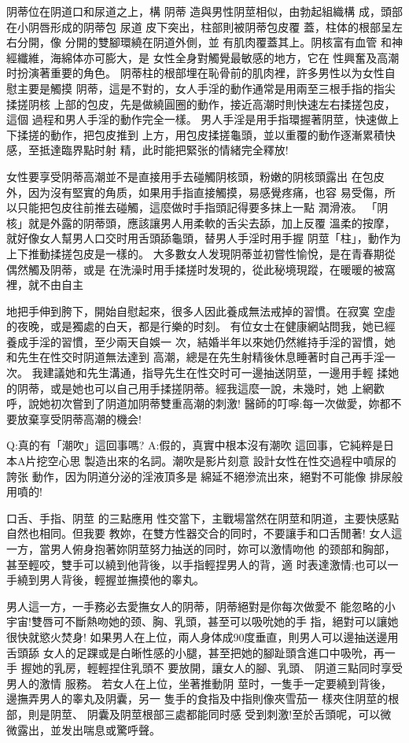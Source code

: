 \documentclass[12pt,UTF8]{ctexbook}
\begin{document}
阴蒂位在阴道口和尿道之上，構
阴蒂
造與男性阴莖相似，由勃起組織構
成，頭部在小阴唇形成的阴蒂包
尿道
皮下突出，柱部則被阴蒂包皮覆
蓋，柱体的根部呈左右分開，像
分開的雙腳環繞在阴道外側，並
有肌肉覆蓋其上。阴核富有血管
和神經纖維，海綿体亦可膨大，是
女性全身對觸覺最敏感的地方，它在
性興奮及高潮时扮演著重要的角色。
阴蒂柱的根部埋在恥骨前的肌肉裡，許多男性以为女性自慰主要是觸摸
阴蒂，這是不對的，女人手淫的動作通常是用兩至三根手指的指尖揉搓阴核
上部的包皮，先是做繞圓圈的動作，接近高潮时則快速左右揉搓包皮，這個
過程和男人手淫的動作完全一樣。
男人手淫是用手指環握著阴莖，快速做上下揉搓的動作，把包皮推到
上方，用包皮揉搓龜頭，並以重覆的動作逐漸累積快感，至抵達臨界點时射
精，此时能把緊张的情緒完全釋放!

女性要享受阴蒂高潮並不是直接用手去碰觸阴核頭，粉嫩的阴核頭露出
在包皮外，因为沒有堅實的角质，如果用手指直接觸摸，易感覺疼痛，也容
易受傷，所以只能把包皮往前推去碰觸，這麼做时手指頭記得要多抹上一點
潤滑液。
「阴核」就是外露的阴蒂頭，應該讓男人用柔軟的舌尖去舔，加上反覆
溫柔的按摩，就好像女人幫男人口交时用舌頭舔龜頭，替男人手淫时用手握
阴莖「柱」，動作为上下推動揉搓包皮是一樣的。
大多數女人发現阴蒂並初嘗性愉悅，是在青春期從偶然觸及阴蒂，或是
在洗澡时用手揉搓时发現的，從此秘境現蹤，在暖暖的被窩裡，就不由自主

地把手伸到胯下，開始自慰起來，很多人因此養成無法戒掉的習慣。在寂寞
空虛的夜晚，或是獨處的白天，都是行樂的时刻。
有位女士在健康網站問我，她已經養成手淫的習慣，至少兩天自娛一
次，結婚半年以來她仍然維持手淫的習慣，她和先生在性交时阴道無法達到
高潮，總是在先生射精後休息睡著时自己再手淫一次。
我建議她和先生溝通，指导先生在性交时可一邊抽送阴莖，一邊用手輕
揉她的阴蒂，或是她也可以自己用手揉搓阴蒂。經我這麼一說，未幾时，她
上網歡呼，說她初次嘗到了阴道加阴蒂雙重高潮的刺激!
醫師的叮嚀:每一次做愛，妳都不要放棄享受阴蒂高潮的機会!

Q:真的有「潮吹」這回事嗎?
A:假的，真實中根本沒有潮吹
這回事，它純粹是日本A片挖空心思
製造出來的名詞。潮吹是影片刻意
設計女性在性交過程中噴尿的誇张
動作，因为阴道分泌的淫液頂多是
綿延不絕滲流出來，絕對不可能像
排尿般用噴的!

口舌、手指、阴莖
的三點應用
性交當下，主戰場當然在阴莖和阴道，主要快感點自然也相同。但我要
教妳，在雙方性器交合的同时，不要讓手和口舌閒著!
女人這一方，當男人俯身抱著妳阴莖努力抽送的同时，妳可以激情吻他
的颈部和胸部，甚至輕咬，雙手可以繞到他背後，以手指輕捏男人的背，適
时表達激情;也可以一手繞到男人背後，輕握並撫摸他的睾丸。

男人這一方，一手務必去愛撫女人的阴蒂，阴蒂絕對是你每次做愛不
能忽略的小宇宙!雙唇可不斷熱吻她的颈、胸、乳頭，甚至可以吸吮她的手
指，絕對可以讓她很快就慾火焚身!
如果男人在上位，兩人身体成90度垂直，則男人可以邊抽送邊用舌頭舔
女人的足踝或是白晰性感的小腿，甚至把她的腳趾頭含進口中吸吮，再一手
握她的乳房，輕輕捏住乳頭不
要放開，讓女人的腳、乳頭、
阴道三點同时享受男人的激情
服務。
若女人在上位，坐著推動阴
莖时，一隻手一定要繞到背後，
邊撫弄男人的睾丸及阴囊，另一
隻手的食指及中指則像夾雪茄一
樣夾住阴莖的根部，則是阴莖、
阴囊及阴莖根部三處都能同时感
受到刺激!至於舌頭呢，可以微
微露出，並发出喘息或驚呼聲。
\end{document}
